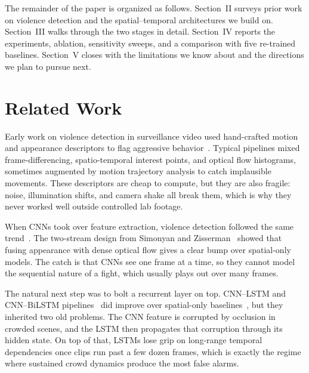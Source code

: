 \documentclass[conference]{IEEEtran}
\begin{document}
The remainder of the paper is organized as follows. Section~II surveys prior work on violence detection and the spatial--temporal architectures we build on. Section~III walks through the two stages in detail. Section~IV reports the experiments, ablation, sensitivity sweeps, and a comparison with five re-trained baselines. Section~V closes with the limitations we know about and the directions we plan to pursue next.


\section{Related Work}

\label{sec:related_work}

Early work on violence detection in surveillance video used hand-crafted motion and appearance descriptors to flag aggressive behavior~\cite{gracia_fast_2015, ramzan_review_2019, bermejo_nievas_violence_2011}. Typical pipelines mixed frame-differencing, spatio-temporal interest points, and optical flow histograms, sometimes augmented by motion trajectory analysis to catch implausible movements. These descriptors are cheap to compute, but they are also fragile: noise, illumination shifts, and camera shake all break them, which is why they never worked well outside controlled lab footage.

When CNNs took over feature extraction, violence detection followed the same trend~\cite{ding_violence_2014, he_deep_2015, simonyan_two-stream_2014, 7410867}. The two-stream design from Simonyan and Zisserman~\cite{simonyan_two-stream_2014} showed that fusing appearance with dense optical flow gives a clear bump over spatial-only models. The catch is that CNNs see one frame at a time, so they cannot model the sequential nature of a fight, which usually plays out over many frames.

The natural next step was to bolt a recurrent layer on top. CNN--LSTM and CNN--BiLSTM pipelines~\cite{hochreiter1997lstm, patel_realtime_2021, traore_violence_2024, sudhakaran_learning_2017} did improve over spatial-only baselines~\cite{pathak_streamlining_2024}, but they inherited two old problems. The CNN feature is corrupted by occlusion in crowded scenes, and the LSTM then propagates that corruption through its hidden state. On top of that, LSTMs lose grip on long-range temporal dependencies once clips run past a few dozen frames, which is exactly the regime where sustained crowd dynamics produce the most false alarms.
\end{document}
